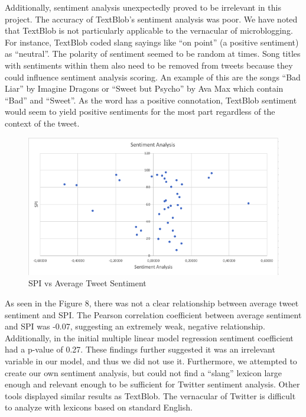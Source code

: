 \documentclass[12pt,conference]{IEEEtran}
\begin{document}
Additionally, sentiment analysis unexpectedly proved to be irrelevant in this project. The accuracy of TextBlob's sentiment analysis was poor. We have noted that TextBlob is not particularly applicable to the vernacular of microblogging. For instance, TextBlob coded slang sayings like ``on point'' (a positive sentiment) as ``neutral''. The polarity of sentiment seemed to be random at times. Song titles with sentiments within them also need to be removed from tweets because they could influence sentiment analysis scoring. An example of this are the songs ``Bad Liar'' by Imagine Dragons or ``Sweet but Psycho'' by Ava Max which contain ``Bad'' and ``Sweet''. As the word has a positive connotation, TextBlob sentiment would seem to yield positive sentiments for the most part regardless of the context of the tweet. \par

\begin{figure}[h!]
  \includegraphics[scale=0.4]{senti.png}
  \caption{SPI vs Average Tweet Sentiment}
  \label{fig:birds}
\end{figure}

As seen in the Figure 8, there was not a clear relationship between average tweet sentiment and SPI. The Pearson correlation coefficient between average sentiment and SPI was -0.07, suggesting an extremely weak, negative relationship. Additionally, in the initial multiple linear model regression sentiment coefficient had a p-value of 0.27. These findings further suggested it was an irrelevant variable in our model, and thus we did not use it. Furthermore, we attempted to create our own sentiment analysis, but could not find a “slang” lexicon large enough and relevant enough to be sufficient for Twitter sentiment analysis. Other tools displayed similar results as TextBlob. The vernacular of Twitter is difficult to analyze with lexicons based on standard English. \par
\end{document}
